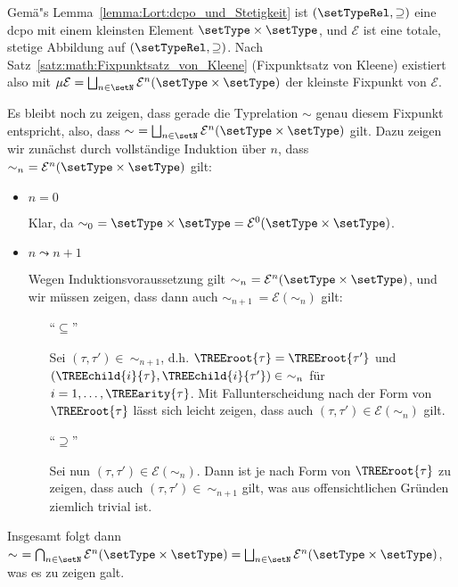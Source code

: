 \begin{beweis}
  Gem\"a"s Lemma~\ref{lemma:Lort:dcpo_und_Stetigkeit} ist $(\setTypeRel,\supseteq)$ eine
  dcpo mit einem kleinsten Element $\setType\times\setType$, und $\mathcal{E}$ ist eine totale, stetige Abbildung auf
  $(\setTypeRel,\supseteq)$. Nach Satz~\ref{satz:math:Fixpunktsatz_von_Kleene} (Fixpunktsatz von Kleene) existiert also
  mit $\mu\mathcal{E} = \bigsqcup_{n\in\setN} \mathcal{E}^n(\setType\times\setType)$ der kleinste Fixpunkt von $\mathcal{E}$.

  Es bleibt noch zu zeigen, dass gerade die Typrelation $\sim$ genau diesem Fixpunkt entspricht, also, dass
  $\sim\ = \bigsqcup_{n\in\setN}\mathcal{E}^n(\setType\times\setType)$ gilt. Dazu zeigen wir zun\"achst
  durch vollst\"andige Induktion \"uber $n$, dass $\sim_n\ = \mathcal{E}^n(\setType\times\setType)$ gilt:
  \begin{itemize}
    \item $n=0$

          Klar, da $\sim_0\ = \setType\times\setType = \mathcal{E}^0(\setType\times\setType)$.

    \item $n\leadsto{n+1}$

          Wegen Induktionsvoraussetzung gilt $\sim_n\ = \mathcal{E}^n(\setType\times\setType)$, und wir
          m\"ussen zeigen, dass dann auch $\sim_{n+1}\ = \mathcal{E}(\sim_n)$ gilt:
          \begin{itemize}
            \item["`$\subseteq$"']
                
                  Sei $(\tau,\tau')\in\ \sim_{n+1}$, d.h. $\TREEroot{\tau}=\TREEroot{\tau'}$ und
                  $(\TREEchild{i}{\tau},\TREEchild{i}{\tau'})\in\ \sim_n$ f\"ur $i=1,\ldots,\TREEarity{\tau}$.
                  Mit Fallunterscheidung nach der Form von $\TREEroot{\tau}$ l\"asst sich leicht zeigen,
                  dass auch $(\tau,\tau')\in\mathcal{E}(\sim_n)$ gilt.

            \item["`$\supseteq$"']

                  Sei nun $(\tau,\tau')\in\mathcal{E}(\sim_n)$. Dann ist je nach Form von $\TREEroot{\tau}$
                  zu zeigen, dass auch $(\tau,\tau')\in\ \sim_{n+1}$ gilt, was aus offensichtlichen Gr\"unden
                  ziemlich trivial ist.
          \end{itemize}
  \end{itemize}
  Insgesamt folgt dann $\sim\ = \bigcap_{n\in\setN}\mathcal{E}^n(\setType\times\setType)
                              = \bigsqcup_{n\in\setN}\mathcal{E}^n(\setType\times\setType)$, was es zu zeigen galt.
\end{beweis}

